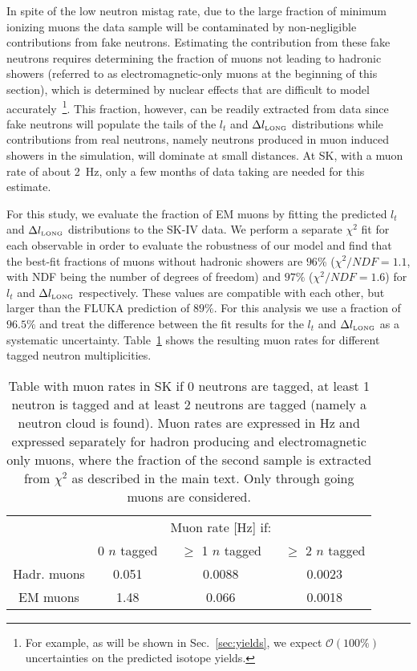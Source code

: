 In spite of the low neutron mistag rate, due to the large fraction of minimum ionizing muons the data sample will be contaminated by non-negligible contributions from fake neutrons. Estimating the contribution from these fake neutrons requires determining the fraction of muons not leading to hadronic showers (referred to as electromagnetic-only muons at the beginning of this section), which is determined by nuclear effects that are difficult to model accurately~\footnote{For example, as will be shown in Sec.~\ref{sec:yields}, we expect $\mathcal{O}(100\%)$ uncertainties on the predicted isotope yields.}. This fraction, however, can be readily extracted from data since fake neutrons will populate the tails of the $l_t$ and $\Delta l_{\mbox{\tiny LONG}}$ distributions while contributions from real neutrons, namely neutrons produced in muon induced showers in the simulation, will dominate at small distances. At SK, with a muon rate of about 2~Hz, only a few months of data taking are needed for this estimate. 

For this study, we evaluate the fraction of EM muons by fitting the predicted $l_t$ and $\Delta l_{\mbox{\tiny LONG}}$ distributions to the SK-IV data. We perform a separate $\chi^2$ fit for each observable in order to evaluate the robustness of our model and find that the best-fit fractions of muons without hadronic showers are $96$\% ($\chi^2/NDF = 1.1$, with NDF being the number of degrees of freedom) and $97\%$ ($\chi^2/NDF = 1.6$) for $l_t$ and $\Delta l_{\mbox{\tiny LONG}}$ respectively. These values are compatible with each other, but larger than the FLUKA prediction of $89\%$. For this analysis we use a fraction of $96.5\%$ and treat the difference between the fit results for the $l_t$ and $\Delta l_{\mbox{\tiny LONG}}$ as a systematic uncertainty. Table~\ref{tab:tab_ratesmu} shows the resulting muon rates for different tagged neutron multiplicities.
\begin{table}
	\begin{center}
		\caption{\label{tab:tab_ratesmu}Table with muon rates in SK if 0 neutrons are tagged, at least 1 neutron is tagged and at least 2 neutrons are tagged (namely a neutron cloud is found). Muon rates are expressed in Hz and expressed separately for hadron producing and electromagnetic only muons, where the fraction of the second sample is extracted from $\chi^2$ as described in the main text. Only through going muons are considered.}
		\begin{tabular}{cccc}
			\toprule 
			&  & Muon rate [Hz] if:  &  \\  
			& 0 $n$ tagged & $\ge$ 1 $n$ tagged  & $\ge$ 2 $n$ tagged  \\ 
			\hline
			Hadr. muons & 0.051 & 0.0088 & 0.0023 \\ 
			EM muons & 1.48 & 0.066 & 0.0018 \\ 
			\bottomrule        %
		\end{tabular}
	\end{center}
\end{table} 

